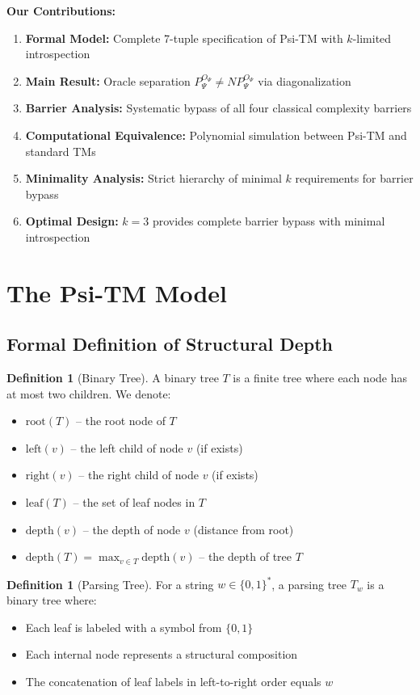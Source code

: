 \documentclass[11pt]{article}
\theoremstyle{definition}
\newtheorem{definition}[theorem]{Definition}
\begin{document}
\textbf{Our Contributions:}
\begin{enumerate}
\item \textbf{Formal Model:} Complete 7-tuple specification of Psi-TM with $k$-limited introspection
\item \textbf{Main Result:} Oracle separation $P^{O_\Psi}_\Psi \neq NP^{O_\Psi}_\Psi$ via diagonalization
\item \textbf{Barrier Analysis:} Systematic bypass of all four classical complexity barriers
\item \textbf{Computational Equivalence:} Polynomial simulation between Psi-TM and standard TMs
\item \textbf{Minimality Analysis:} Strict hierarchy of minimal $k$ requirements for barrier bypass
\item \textbf{Optimal Design:} $k=3$ provides complete barrier bypass with minimal introspection
\end{enumerate}

\section{The Psi-TM Model}

\subsection{Formal Definition of Structural Depth}

\begin{definition}[Binary Tree]
A binary tree $T$ is a finite tree where each node has at most two children. We denote:
\begin{itemize}
\item $\text{root}(T)$ -- the root node of $T$
\item $\text{left}(v)$ -- the left child of node $v$ (if exists)
\item $\text{right}(v)$ -- the right child of node $v$ (if exists)
\item $\text{leaf}(T)$ -- the set of leaf nodes in $T$
\item $\text{depth}(v)$ -- the depth of node $v$ (distance from root)
\item $\text{depth}(T) = \max_{v \in T} \text{depth}(v)$ -- the depth of tree $T$
\end{itemize}
\end{definition}

\begin{definition}[Parsing Tree]
For a string $w \in \{0,1\}^*$, a parsing tree $T_w$ is a binary tree where:
\begin{itemize}
\item Each leaf is labeled with a symbol from $\{0,1\}$
\item Each internal node represents a structural composition
\item The concatenation of leaf labels in left-to-right order equals $w$
\end{itemize}
\end{definition}
\end{document}
